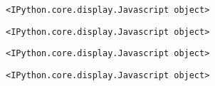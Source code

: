\documentclass[11pt]{article}
\makeatletter
\newcommand{\boxspacing}{\kern\kvtcb@left@rule\kern\kvtcb@boxsep}
\newcommand{\prompt}[4]{
        {\ttfamily\llap{{\color{#2}[#3]:\hspace{3pt}#4}}\vspace{-\baselineskip}}
    }
\makeatother
\begin{document}
    
    
    \begin{Verbatim}[commandchars=\\\{\}]
<IPython.core.display.Javascript object>
    \end{Verbatim}

    
    
    \begin{Verbatim}[commandchars=\\\{\}]
<IPython.core.display.Javascript object>
    \end{Verbatim}

    
    
    \begin{Verbatim}[commandchars=\\\{\}]
<IPython.core.display.Javascript object>
    \end{Verbatim}

    
    
    \begin{Verbatim}[commandchars=\\\{\}]
<IPython.core.display.Javascript object>
    \end{Verbatim}

    
    \begin{tcolorbox}[breakable, size=fbox, boxrule=1pt, pad at break*=1mm,colback=cellbackground, colframe=cellborder]
\prompt{In}{incolor}{ }{\boxspacing}
\begin{Verbatim}[commandchars=\\\{\}]

\end{Verbatim}
\end{tcolorbox}


    
    
    
\end{document}

